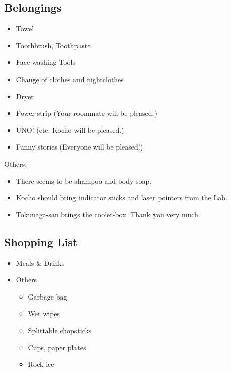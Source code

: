 \documentclass[unicode,a4paper,11pt]{ltjsarticle}
\begin{document}
\subsection*{Belongings}

\begin{itemize}
      \item
            Towel
      \item
            Toothbrush, Toothpaste
      \item
            Face-washing Tools
      \item
            Change of clothes and nightclothes
      \item
            Dryer
      \item
            Power strip (Your roommate will be pleased.)
      \item
            UNO! (etc. Kocho will be pleased.)
      \item
            Funny stories (Everyone will be pleased!)
\end{itemize}

Others:
\begin{itemize}
      \item
            There seems to be shampoo and body soap.
      \item
            Kocho should bring indicator sticks and laser pointers from the Lab.
      \item
            Tokunaga-san brings the cooler-box. Thank you very much.
\end{itemize}


\subsection*{Shopping List}

\begin{itemize}
      \item
            Meals \& Drinks
      \item
            Others
            \begin{itemize}
                  \item
                        Garbage bag
                  \item
                        Wet wipes
                  \item
                        Splittable chopsticks
                  \item
                        Cups, paper plates
                  \item
                        Rock ice
            \end{itemize}
\end{itemize}
\end{document}
